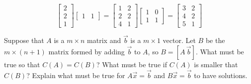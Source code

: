\documentclass[]{exam}
\begin{document}
\begin{questions}
\begin{solution}
\[		\begin{bmatrix}
			2 \\ 2 \\ 1
		\end{bmatrix}
		\begin{bmatrix}
			1 & 1
		\end{bmatrix}
		=
		\begin{bmatrix}
			1 & 2 \\
			2 & 2 \\
			4 & 1
		\end{bmatrix}
		\begin{bmatrix}
			1 & 0 \\
			1 & 1
		\end{bmatrix} = 
		\begin{bmatrix}
			3 & 2 \\
			4 & 2 \\
			5 & 1
		\end{bmatrix}
	\]
\end{solution}

\question Suppose that $A$ is a $m \times n$ matrix and $\vec{b}$ is a $m \times 1$ vector. Let $B$ be the $m \times (n+1)$ matrix formed by adding $\vec{b}$ to $A$, so $B = [A \, \vec{b}]$. What must be true so that $C(A)=C(B)$? What must be true if $C(A)$ is smaller that $C(B)$? Explain what must be true for $A \vec{x} = \vec{b}$ and $B \vec{x} = \vec{b}$ to have solutions. 



\end{questions}
\end{document}
